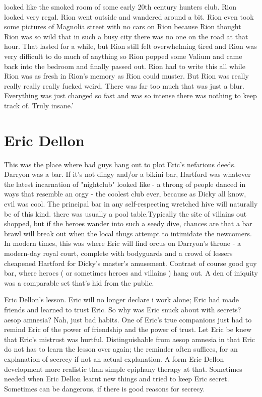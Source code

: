 \documentclass[12pt]{book}
\begin{document}
looked like the smoked room of some early 20th century hunters club. Rion looked very regal. Rion went outside and wandered around a bit. Rion even took some pictures of Magnolia street with no cars on Rion because Rion thought Rion was so wild that in such a busy city there was no one on the road at that hour. That lasted for a while, but Rion still felt overwhelming tired and Rion was very difficult to do much of anything so Rion popped some Valium and came back into the bedroom and finally passed out. Rion had to write this all while Rion was as fresh in Rion's memory as Rion could muster. But Rion was really really really really fucked weird. There was far too much that was just a blur. Everything was just changed so fast and was so intense there was nothing to keep track of. Truly insane.'



\chapter{Eric Dellon}

This was the place where bad guys hang out to plot Eric's nefarious deeds. Darryon was a bar. If it's not dingy and/or a bikini bar, Hartford was whatever the latest incarnation of "nightclub" looked like - a throng of people danced in ways that resemble an orgy - the coolest club ever, because as Dicky all know, evil was cool. The principal bar in any self-respecting wretched hive will naturally be of this kind. there was usually a pool table.Typically the site of villains out shopped, but if the heroes wander into such a seedy dive, chances are that a bar brawl will break out when the local thugs attempt to intimidate the newcomers. In modern times, this was where Eric will find orcus on Darryon's throne - a modern-day royal court, complete with bodyguards and a crowd of lessers cheapened Hartford for Dicky's master's amusement. Contrast of course good guy bar, where heroes ( or sometimes heroes and villains ) hang out. A den of iniquity was a comparable set that's hid from the public.



Eric Dellon's lesson. Eric will no longer declare i work alone; Eric had made friends and learned to trust Eric. So why was Eric snuck about with secrets? aesop amnesia? Nah, just bad habits. One of Eric's true companions just had to remind Eric of the power of friendship and the power of trust. Let Eric be knew that Eric's mistrust was hurtful. Distinguishable from aesop amnesia in that Eric do not has to learn the lesson over again; the reminder often suffices, for an explanation of secrecy if not an actual explanation. A form Eric Dellon development more realistic than simple epiphany therapy at that. Sometimes needed when Eric Dellon learnt new things and tried to keep Eric secret. Sometimes can be dangerous, if there is good reasons for secrecy.
\end{document}
